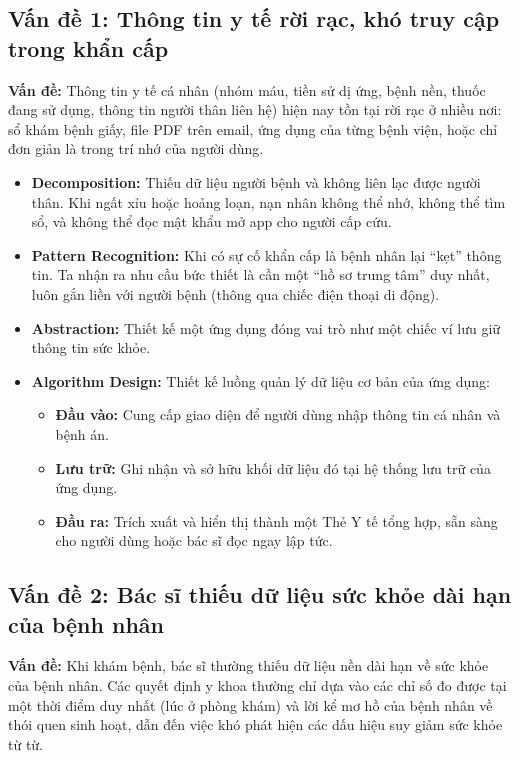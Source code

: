 \documentclass[a4paper,12pt]{article}
\begin{document}
\subsection{Vấn đề 1: Thông tin y tế rời rạc, khó truy cập trong khẩn cấp}

\textbf{Vấn đề:} Thông tin y tế cá nhân (nhóm máu, tiền sử dị ứng, bệnh nền, thuốc đang sử dụng, thông tin người thân liên hệ) hiện nay tồn tại rời rạc ở nhiều nơi: sổ khám bệnh giấy, file PDF trên email, ứng dụng của từng bệnh viện, hoặc chỉ đơn giản là trong trí nhớ của người dùng.

\begin{itemize}
    \item \textbf{Decomposition:} Thiếu dữ liệu người bệnh và không liên lạc được người thân. Khi ngất xỉu hoặc hoảng loạn, nạn nhân không thể nhớ, không thể tìm sổ, và không thể đọc mật khẩu mở app cho người cấp cứu.
    \item \textbf{Pattern Recognition:} Khi có sự cố khẩn cấp là bệnh nhân lại ``kẹt'' thông tin. Ta nhận ra nhu cầu bức thiết là cần một ``hồ sơ trung tâm'' duy nhất, luôn gắn liền với người bệnh (thông qua chiếc điện thoại di động).
    \item \textbf{Abstraction:} Thiết kế một ứng dụng đóng vai trò như một chiếc ví lưu giữ thông tin sức khỏe.
    \item \textbf{Algorithm Design:} Thiết kế luồng quản lý dữ liệu cơ bản của ứng dụng:
    \begin{itemize}
        \item \textbf{Đầu vào:} Cung cấp giao diện để người dùng nhập thông tin cá nhân và bệnh án.
        \item \textbf{Lưu trữ:} Ghi nhận và sở hữu khối dữ liệu đó tại hệ thống lưu trữ của ứng dụng.
        \item \textbf{Đầu ra:} Trích xuất và hiển thị thành một Thẻ Y tế tổng hợp, sẵn sàng cho người dùng hoặc bác sĩ đọc ngay lập tức.
    \end{itemize}
\end{itemize}

\subsection{Vấn đề 2: Bác sĩ thiếu dữ liệu sức khỏe dài hạn của bệnh nhân}

\textbf{Vấn đề:} Khi khám bệnh, bác sĩ thường thiếu dữ liệu nền dài hạn về sức khỏe của bệnh nhân. Các quyết định y khoa thường chỉ dựa vào các chỉ số đo được tại một thời điểm duy nhất (lúc ở phòng khám) và lời kể mơ hồ của bệnh nhân về thói quen sinh hoạt, dẫn đến việc khó phát hiện các dấu hiệu suy giảm sức khỏe từ từ.
\end{document}
